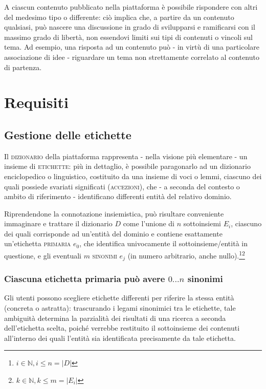 \documentclass[10pt,a4paper,headinclude,footinclude,hidelinks]{scrreprt} %
\begin{document}
	A ciascun contenuto pubblicato nella piattaforma è possibile rispondere con altri del medesimo tipo o differente: ciò implica che, a partire da un contenuto qualsiasi, può nascere una discussione in grado di svilupparsi e ramificarsi con il massimo grado di libertà, non essendovi limiti sui tipi di contenuti o vincoli sul tema. Ad esempio, una risposta ad un contenuto può - in virtù di una particolare associazione di idee - riguardare un tema non strettamente correlato al contenuto di partenza.
	

	\chapter{Requisiti}
	\label{ch:stage:req}
	
	\section{Gestione delle etichette}
	\label{sec:stage:req:tag}
	
	Il \textsc{dizionario} della piattaforma rappresenta - nella visione più elementare - un insieme di \textsc{etichette}: più in dettaglio, è possibile paragonarlo ad un dizionario enciclopedico o linguistico, costituito da una insieme di voci o lemmi, ciascuno dei quali possiede svariati significati (\textsc{accezioni}), che - a seconda del contesto o ambito di riferimento - identificano differenti entità del relativo dominio.

Riprendendone la connotazione insiemistica, può risultare conveniente immaginare e trattare il dizionario $D$ come l'unione di $n$ sottoinsiemi $E_i$, ciascuno dei quali corrisponde ad un'entità del dominio e contiene esattamente un'etichetta \textsc{primaria} $e_0$, che identifica univocamente il sottoinsieme/entità in questione, e gli eventuali $m$ \textsc{sinonimi} $e_j$ (in numero arbitrario, anche nullo).\footnote{$i \in \mathbb{N}, i \leq n=\left|D\right|$}\footnote{$k \in \mathbb{N}, k \leq m=\left|E_i\right|$}


	\subsection[Sinonimi]{Ciascuna etichetta primaria può avere $0...n$ sinonimi}
	Gli utenti possono scegliere etichette differenti per riferire la stessa entità (concreta o astratta): trascurando i legami sinonimici tra le etichette, tale ambiguità determina la parzialità dei risultati di una ricerca a seconda dell'etichetta scelta, poiché verrebbe restituito il sottoinsieme dei contenuti all'interno dei quali l'entità sia identificata precisamente da tale etichetta.
	
\end{document}
